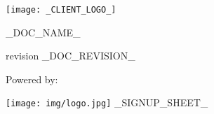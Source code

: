 \texttt{[image: \_CLIENT\_LOGO\_]}

\vspace{80px}

\centerline{\Huge _DOC_NAME_}

\vspace{40px}

\centerline{\large revision _DOC_REVISION_}

\vspace{80px}

\centerline{\huge Powered by:}
\texttt{[image: img/logo.jpg]}
_SIGNUP_SHEET_
\newpage
